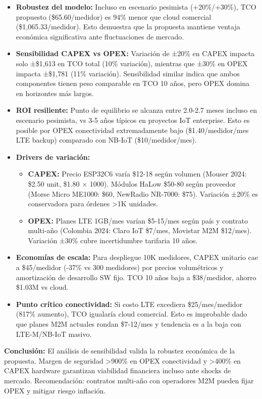 \begin{itemize}
    \item \textbf{Robustez del modelo:} Incluso en escenario pesimista (+20\%/+30\%), TCO propuesto (\$65.60/medidor) es 94\% menor que cloud comercial (\$1,065.33/medidor). Esto demuestra que la propuesta mantiene ventaja económica significativa ante fluctuaciones de mercado.
    
    \item \textbf{Sensibilidad CAPEX vs OPEX:} Variación de ±20\% en CAPEX impacta solo ±\$1,613 en TCO total (10\% variación), mientras que ±30\% en OPEX impacta ±\$1,781 (11\% variación). Sensibilidad similar indica que ambos componentes tienen peso comparable en TCO 10 años, pero OPEX domina en horizontes más largos.
    
    \item \textbf{ROI resiliente:} Punto de equilibrio se alcanza entre 2.0-2.7 meses incluso en escenario pesimista, vs 3-5 años típicos en proyectos IoT enterprise. Esto es posible por OPEX conectividad extremadamente bajo (\$1.40/medidor/mes LTE backup) comparado con NB-IoT (\$10/medidor/mes).
    
    \item \textbf{Drivers de variación:}
    \begin{itemize}
        \item \textbf{CAPEX:} Precio ESP32C6 varía \$12-18 según volumen (Mouser 2024: \$2.50 unit, \$1.80 $\times$ 1000). Módulos HaLow \$50-80 según proveedor (Morse Micro ME1000: \$60, NewRadio NR-7000: \$75). Variación ±20\% es conservadora para órdenes >1K unidades.
        \item \textbf{OPEX:} Planes LTE 1GB/mes varían \$5-15/mes según país y contrato multi-año (Colombia 2024: Claro IoT \$7/mes, Movistar M2M \$12/mes). Variación ±30\% cubre incertidumbre tarifaria 10 años.
    \end{itemize}
    
    \item \textbf{Economías de escala:} Para despliegue 10K medidores, CAPEX unitario cae a \$45/medidor (-37\% vs 300 medidores) por precios volumétricos y amortización de desarrollo SW fijo. TCO 10 años baja a \$38/medidor, ahorro \$1.03M vs cloud.
    
    \item \textbf{Punto crítico conectividad:} Si costo LTE excediera \$25/mes/medidor (817\% aumento), TCO igualaría cloud comercial. Esto es improbable dado que planes M2M actuales rondan \$7-12/mes y tendencia es a la baja con LTE-M/NB-IoT masivo.
\end{itemize}

\textbf{Conclusión:} El análisis de sensibilidad valida la robustez económica de la propuesta. Margen de seguridad >900\% en OPEX conectividad y >400\% en CAPEX hardware garantizan viabilidad financiera incluso ante shocks de mercado. Recomendación: contratos multi-año con operadores M2M pueden fijar OPEX y mitigar riesgo inflación.

